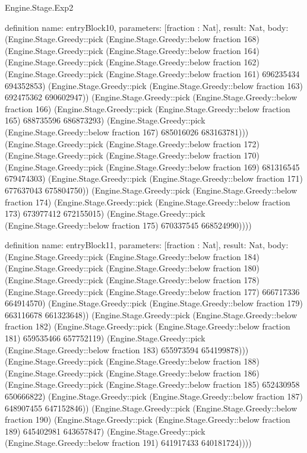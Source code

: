 \begin{lexlean}{Engine.Stage.Exp2}
\begin{semanticmodule}
definition{
  name: entryBlock10,
  parameters: [fraction : Nat],
  result: Nat,
  body: (Engine.Stage.Greedy::pick (Engine.Stage.Greedy::below fraction 168) (Engine.Stage.Greedy::pick (Engine.Stage.Greedy::below fraction 164) (Engine.Stage.Greedy::pick (Engine.Stage.Greedy::below fraction 162) (Engine.Stage.Greedy::pick (Engine.Stage.Greedy::below fraction 161) 696235434 694352853) (Engine.Stage.Greedy::pick (Engine.Stage.Greedy::below fraction 163) 692475362 690602947)) (Engine.Stage.Greedy::pick (Engine.Stage.Greedy::below fraction 166) (Engine.Stage.Greedy::pick (Engine.Stage.Greedy::below fraction 165) 688735596 686873293) (Engine.Stage.Greedy::pick (Engine.Stage.Greedy::below fraction 167) 685016026 683163781))) (Engine.Stage.Greedy::pick (Engine.Stage.Greedy::below fraction 172) (Engine.Stage.Greedy::pick (Engine.Stage.Greedy::below fraction 170) (Engine.Stage.Greedy::pick (Engine.Stage.Greedy::below fraction 169) 681316545 679474303) (Engine.Stage.Greedy::pick (Engine.Stage.Greedy::below fraction 171) 677637043 675804750)) (Engine.Stage.Greedy::pick (Engine.Stage.Greedy::below fraction 174) (Engine.Stage.Greedy::pick (Engine.Stage.Greedy::below fraction 173) 673977412 672155015) (Engine.Stage.Greedy::pick (Engine.Stage.Greedy::below fraction 175) 670337545 668524990))))
}

definition{
  name: entryBlock11,
  parameters: [fraction : Nat],
  result: Nat,
  body: (Engine.Stage.Greedy::pick (Engine.Stage.Greedy::below fraction 184) (Engine.Stage.Greedy::pick (Engine.Stage.Greedy::below fraction 180) (Engine.Stage.Greedy::pick (Engine.Stage.Greedy::below fraction 178) (Engine.Stage.Greedy::pick (Engine.Stage.Greedy::below fraction 177) 666717336 664914570) (Engine.Stage.Greedy::pick (Engine.Stage.Greedy::below fraction 179) 663116678 661323648)) (Engine.Stage.Greedy::pick (Engine.Stage.Greedy::below fraction 182) (Engine.Stage.Greedy::pick (Engine.Stage.Greedy::below fraction 181) 659535466 657752119) (Engine.Stage.Greedy::pick (Engine.Stage.Greedy::below fraction 183) 655973594 654199878))) (Engine.Stage.Greedy::pick (Engine.Stage.Greedy::below fraction 188) (Engine.Stage.Greedy::pick (Engine.Stage.Greedy::below fraction 186) (Engine.Stage.Greedy::pick (Engine.Stage.Greedy::below fraction 185) 652430958 650666822) (Engine.Stage.Greedy::pick (Engine.Stage.Greedy::below fraction 187) 648907455 647152846)) (Engine.Stage.Greedy::pick (Engine.Stage.Greedy::below fraction 190) (Engine.Stage.Greedy::pick (Engine.Stage.Greedy::below fraction 189) 645402981 643657847) (Engine.Stage.Greedy::pick (Engine.Stage.Greedy::below fraction 191) 641917433 640181724))))
}


\end{semanticmodule}
\end{lexlean}
